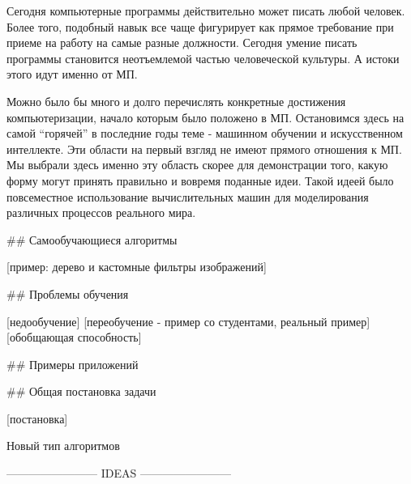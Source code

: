Сегодня компьютерные программы действительно может писать любой человек. 
Более того, подобный навык все чаще фигурирует как прямое требование при приеме на работу на самые разные должности.
Сегодня умение писать программы становится неотъемлемой частью человеческой культуры.
А истоки этого идут именно от МП.

Можно было бы много и долго перечислять конкретные достижения компьютеризации, начало которым было положено в МП.
Остановимся здесь на самой “горячей” в последние годы теме - машинном обучении и искусственном интеллекте.
Эти области на первый взгляд не имеют прямого отношения к МП.
Мы выбрали здесь именно эту область скорее для демонстрации того, какую форму могут принять правильно и вовремя поданные идеи.
Такой идеей было повсеместное использование вычислительных машин для моделирования различных процессов реального мира.

## Самообучающиеся алгоритмы

[пример: дерево и кастомные фильтры изображений]

## Проблемы обучения

[недообучение]
[переобучение - пример со студентами, реальный пример]
[обобщающая способность]

## Примеры приложений

## Общая постановка задачи

[постановка]









Новый тип алгоритмов

------------------------ IDEAS ------------------------ 

